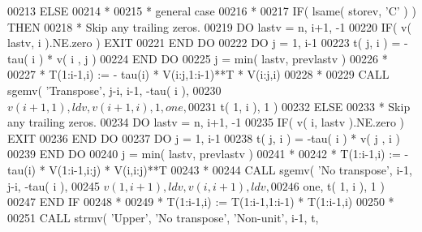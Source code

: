 \begin{DoxyCode}
00213             \textcolor{keywordflow}{ELSE}
00214 \textcolor{comment}{*}
00215 \textcolor{comment}{*              general case}
00216 \textcolor{comment}{*}
00217                \textcolor{keywordflow}{IF}( lsame( storev, \textcolor{stringliteral}{'C'} ) ) \textcolor{keywordflow}{THEN}
00218 \textcolor{comment}{*                 Skip any trailing zeros.}
00219                   \textcolor{keywordflow}{DO} lastv = n, i+1, -1
00220                      \textcolor{keywordflow}{IF}( v( lastv, i ).NE.zero ) \textcolor{keywordflow}{EXIT}
00221 \textcolor{keywordflow}{                  END DO}
00222                   \textcolor{keywordflow}{DO} j = 1, i-1
00223                      t( j, i ) = -tau( i ) * v( i , j )
00224 \textcolor{keywordflow}{                  END DO}   
00225                   j = min( lastv, prevlastv )
00226 \textcolor{comment}{*}
00227 \textcolor{comment}{*                 T(1:i-1,i) := - tau(i) * V(i:j,1:i-1)**T * V(i:j,i)}
00228 \textcolor{comment}{*}
00229                   \textcolor{keyword}{CALL }sgemv( \textcolor{stringliteral}{'Transpose'}, j-i, i-1, -tau( i ),
00230      $                        v( i+1, 1 ), ldv, v( i+1, i ), 1, one,
00231      $                        t( 1, i ), 1 )
00232                \textcolor{keywordflow}{ELSE}
00233 \textcolor{comment}{*                 Skip any trailing zeros.}
00234                   \textcolor{keywordflow}{DO} lastv = n, i+1, -1
00235                      \textcolor{keywordflow}{IF}( v( i, lastv ).NE.zero ) \textcolor{keywordflow}{EXIT}
00236 \textcolor{keywordflow}{                  END DO}
00237                   \textcolor{keywordflow}{DO} j = 1, i-1
00238                      t( j, i ) = -tau( i ) * v( j , i )
00239 \textcolor{keywordflow}{                  END DO}   
00240                   j = min( lastv, prevlastv )
00241 \textcolor{comment}{*}
00242 \textcolor{comment}{*                 T(1:i-1,i) := - tau(i) * V(1:i-1,i:j) * V(i,i:j)**T}
00243 \textcolor{comment}{*}
00244                   \textcolor{keyword}{CALL }sgemv( \textcolor{stringliteral}{'No transpose'}, i-1, j-i, -tau( i ),
00245      $                        v( 1, i+1 ), ldv, v( i, i+1 ), ldv, 
00246      $                        one, t( 1, i ), 1 )
00247 \textcolor{keywordflow}{               END IF}
00248 \textcolor{comment}{*}
00249 \textcolor{comment}{*              T(1:i-1,i) := T(1:i-1,1:i-1) * T(1:i-1,i)}
00250 \textcolor{comment}{*}
00251                \textcolor{keyword}{CALL }strmv( \textcolor{stringliteral}{'Upper'}, \textcolor{stringliteral}{'No transpose'}, \textcolor{stringliteral}{'Non-unit'}, i-1, t,

\end{DoxyCode}
